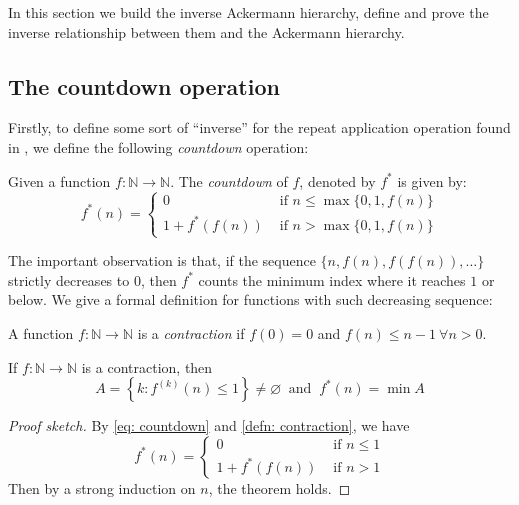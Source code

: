 In this section we build the inverse Ackermann hierarchy, define and prove the inverse relationship between them and the Ackermann hierarchy.

\subsection{The countdown operation}

Firstly, to define some sort of ``inverse'' for the repeat application operation found in , we define the following \textit{countdown} operation:

\begin{defn} \label{defn: countdown}
Given a function $f: \mathbb{N} \to \mathbb{N}$. The \textit{countdown} of $f$, denoted by $f^*$ is given by:
\begin{equation} \label{eq: countdown}
f^*(n) = \begin{cases}
0 & \text{ if } n \le \max\{0, 1, f(n)\} \\ 1 + f^*(f(n)) & \text{ if } n > \max\{0, 1, f(n)\}
\end{cases}
\end{equation}
\end{defn}
The important observation is that, if the sequence $\{n, f(n), f(f(n)), \ldots\}$ strictly decreases to $0$, then $f^*$ counts the minimum index where it reaches $1$ or below. We give a formal definition for functions with such decreasing sequence:

\begin{defn} \label{defn: contraction}
A function $f: \mathbb{N} \to \mathbb{N}$ is a \textit{contraction} if $f(0) = 0$ and $f(n) \le n-1 \ \forall n > 0$.
\end{defn}

\begin{thm} \label{thm: countdown contraction}
If $f: \mathbb{N} \to \mathbb{N}$ is a contraction, then
\begin{equation}
A = \left\{k: f^{(k)}(n) \le 1\right\} \neq \varnothing \ \text{ and } \ f^*(n) = \min A
\end{equation}
\end{thm}

\begin{proof}[Proof sketch]
By \eqref{eq: countdown} and \cref{defn: contraction}, we have
\begin{equation*}
f^*(n) = \begin{cases}
0 & \text{ if } n \le 1 \\ 1 + f^*(f(n)) & \text{ if } n > 1
\end{cases}
\end{equation*}
Then by a strong induction on $n$, the theorem holds.
\end{proof}

